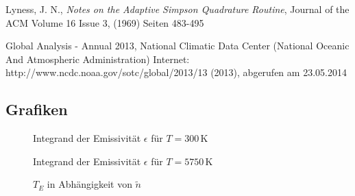 \documentclass[10pt,a4paper]{article}
\begin{document}
\begin{thebibliography}{9}

 Lyness, J. N.,
 \emph{Notes on the Adaptive Simpson Quadrature Routine},
Journal of the ACM
Volume 16 Issue 3, (1969) 
Seiten 483-495 

Global Analysis - Annual 2013, National Climatic Data Center (National Oceanic And Atmospheric Administration) Internet: http://www.ncdc.noaa.gov/sotc/global/2013/13 (2013), abgerufen am 23.05.2014

\end{thebibliography}

\begin{appendix}
\section{Grafiken}

\begin{figure}[htbp]
\centering

\caption{Integrand der Emissivität $\epsilon$ für $T=300\, \si{\kelvin}$}


\caption{Integrand der Emissivität $\epsilon$ für $T=5750\, \si{\kelvin}$}
\label{fig:integranden}
\end{figure}

\begin{figure}
\centering

\caption{$T_E$ in Abhängigkeit von $\tilde{n}$}
\label{fig:ergebnisse}
\end{figure}
\end{appendix}
\end{document}
